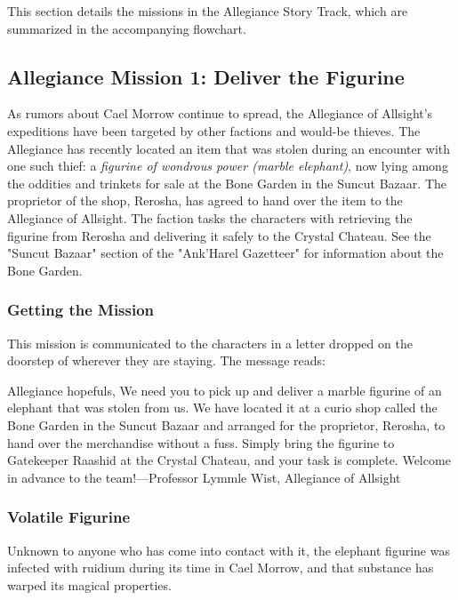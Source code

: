\documentclass[letterpaper, 11pt, bg=full, twocolumn]{dndbook}
\begin{document}
This section details the missions in the Allegiance Story Track, which are summarized in the accompanying flowchart.



\subsection{Allegiance Mission 1: Deliver the Figurine}

As rumors about Cael Morrow continue to spread, the Allegiance of Allsight's expeditions have been targeted by other factions and would-be thieves. The Allegiance has recently located an item that was stolen during an encounter with one such thief: a \textit{figurine of wondrous power (marble elephant)}, now lying among the oddities and trinkets for sale at the Bone Garden in the Suncut Bazaar. The proprietor of the shop, Rerosha, has agreed to hand over the item to the Allegiance of Allsight. The faction tasks the characters with retrieving the figurine from Rerosha and delivering it safely to the Crystal Chateau. See the "Suncut Bazaar" section of the "Ank'Harel Gazetteer" for information about the Bone Garden.

\subsubsection{Getting the Mission}

This mission is communicated to the characters in a letter dropped on the doorstep of wherever they are staying. The message reads:

\begin{DndReadAloud}
Allegiance hopefuls,
We need you to pick up and deliver a marble figurine of an elephant that was stolen from us. We have located it at a curio shop called the Bone Garden in the Suncut Bazaar and arranged for the proprietor, Rerosha, to hand over the merchandise without a fuss. Simply bring the figurine to Gatekeeper Raashid at the Crystal Chateau, and your task is complete.
Welcome in advance to the team!---Professor Lymmle Wist, Allegiance of Allsight
\end{DndReadAloud}

\subsubsection{Volatile Figurine}

Unknown to anyone who has come into contact with it, the elephant figurine was infected with ruidium during its time in Cael Morrow, and that substance has warped its magical properties.
\end{document}
